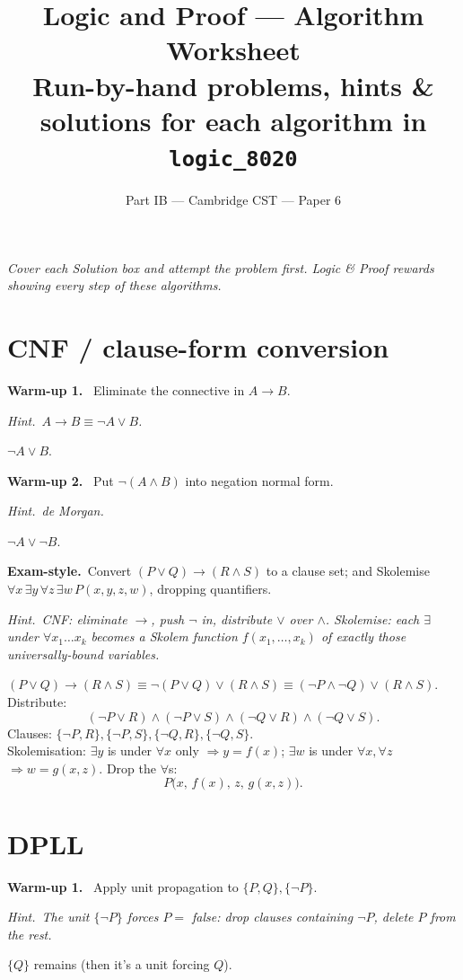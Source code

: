 \documentclass[11pt,a4paper]{article}
\title{\vspace{-1.5cm}\textbf{Logic and Proof --- Algorithm Worksheet}\\[2pt]
\large Run-by-hand problems, hints \& solutions for each algorithm in \texttt{logic\_8020}}
\author{\small Part IB --- Cambridge CST --- Paper 6}
\date{}
\newcommand{\hint}[1]{\par{\small\textcolor{accent}{\textit{Hint.}}\ \textit{#1}}\par\smallskip}
\newcommand{\warm}[1]{\smallskip\textbf{\textcolor{hi}{Warm-up #1.}}\ }
\newcommand{\exam}{\smallskip\textbf{\textcolor{warn}{Exam-style.}}\ }
\newcommand{\imp}{\rightarrow}
\begin{document}
\maketitle
\vspace{-0.8cm}
\textit{Cover each Solution box and attempt the problem first. Logic \& Proof rewards showing every step of these algorithms.}

\hrulefill

\section{CNF / clause-form conversion}

\warm{1} Eliminate the connective in $A\imp B$.
\hint{$A\imp B\equiv \neg A\vee B$.}
\begin{sol}$\neg A\vee B$.\end{sol}

\warm{2} Put $\neg(A\wedge B)$ into negation normal form.
\hint{de Morgan.}
\begin{sol}$\neg A\vee\neg B$.\end{sol}

\exam Convert $(P\vee Q)\imp(R\wedge S)$ to a clause set; and Skolemise $\forall x\,\exists y\,\forall z\,\exists w\,P(x,y,z,w)$, dropping quantifiers.
\hint{CNF: eliminate $\imp$, push $\neg$ in, distribute $\vee$ over $\wedge$. Skolemise: each $\exists$ under $\forall x_1\dots x_k$ becomes a Skolem function $f(x_1,\dots,x_k)$ of exactly those universally-bound variables.}
\begin{sol}
$(P\vee Q)\imp(R\wedge S)\equiv \neg(P\vee Q)\vee(R\wedge S)\equiv(\neg P\wedge\neg Q)\vee(R\wedge S)$. Distribute:
\[(\neg P\vee R)\wedge(\neg P\vee S)\wedge(\neg Q\vee R)\wedge(\neg Q\vee S).\]
Clauses: $\{\neg P,R\},\{\neg P,S\},\{\neg Q,R\},\{\neg Q,S\}$.\\[3pt]
Skolemisation: $\exists y$ is under $\forall x$ only $\Rightarrow y=f(x)$; $\exists w$ is under $\forall x,\forall z$ $\Rightarrow w=g(x,z)$. Drop the $\forall$s:
\[P\big(x,\,f(x),\,z,\,g(x,z)\big).\]
\end{sol}

\section{DPLL}

\warm{1} Apply unit propagation to $\{P,Q\},\{\neg P\}$.
\hint{The unit $\{\neg P\}$ forces $P=$ false: drop clauses containing $\neg P$, delete $P$ from the rest.}
\begin{sol}$\{Q\}$ remains (then it's a unit forcing $Q$).\end{sol}
\end{document}
